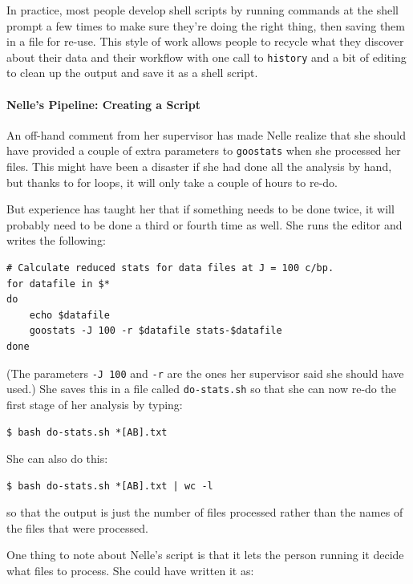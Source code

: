 \documentclass[]{book}
\begin{document}
In practice, most people develop shell scripts by running commands at
the shell prompt a few times to make sure they're doing the right thing,
then saving them in a file for re-use. This style of work allows people
to recycle what they discover about their data and their workflow with
one call to \texttt{history} and a bit of editing to clean up the output
and save it as a shell script.

\mbox{}\paragraph{Nelle's Pipeline: Creating a Script}

An off-hand comment from her supervisor has made Nelle realize that she
should have provided a couple of extra parameters to \texttt{goostats}
when she processed her files. This might have been a disaster if she had
done all the analysis by hand, but thanks to for loops, it will only
take a couple of hours to re-do.

But experience has taught her that if something needs to be done twice,
it will probably need to be done a third or fourth time as well. She
runs the editor and writes the following:

\begin{verbatim}
# Calculate reduced stats for data files at J = 100 c/bp.
for datafile in $*
do
    echo $datafile
    goostats -J 100 -r $datafile stats-$datafile
done
\end{verbatim}

(The parameters \texttt{-J 100} and \texttt{-r} are the ones her
supervisor said she should have used.) She saves this in a file called
\texttt{do-stats.sh} so that she can now re-do the first stage of her
analysis by typing:

\begin{verbatim}
$ bash do-stats.sh *[AB].txt
\end{verbatim}

She can also do this:

\begin{verbatim}
$ bash do-stats.sh *[AB].txt | wc -l
\end{verbatim}

so that the output is just the number of files processed rather than the
names of the files that were processed.

One thing to note about Nelle's script is that it lets the person
running it decide what files to process. She could have written it as:
\end{document}
